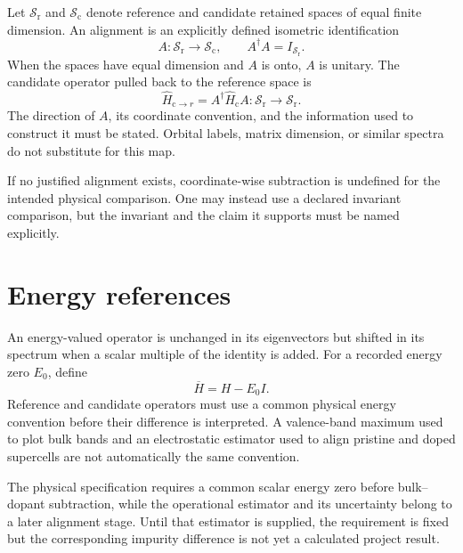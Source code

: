Let $\mathcal S_{\mathrm r}$ and $\mathcal S_{\mathrm c}$ denote reference and
candidate retained spaces of equal finite dimension. An alignment is an
explicitly defined isometric identification
\begin{equation}
  A:\mathcal S_{\mathrm r}\longrightarrow\mathcal S_{\mathrm c},
  \qquad
  A^{\dagger}A=I_{\mathcal S_{\mathrm r}}.
\end{equation}
When the spaces have equal dimension and $A$ is onto, $A$ is unitary. The
candidate operator pulled back to the reference space is
\begin{equation}
  \widehat H_{\mathrm c\rightarrow r}
  =
  A^{\dagger}\widehat H_{\mathrm c}A
  :\mathcal S_{\mathrm r}\longrightarrow\mathcal S_{\mathrm r}.
\end{equation}
The direction of $A$, its coordinate convention, and the information used to
construct it must be stated. Orbital labels, matrix dimension, or similar
spectra do not substitute for this map.

If no justified alignment exists, coordinate-wise subtraction is undefined for
the intended physical comparison. One may instead use a declared invariant
comparison, but the invariant and the claim it supports must be named
explicitly.

\section{Energy references}


An energy-valued operator is unchanged in its eigenvectors but shifted in its
spectrum when a scalar multiple of the identity is added. For a recorded energy
zero $E_0$, define
\begin{equation}
  \overline H=H-E_0I.
\end{equation}
Reference and candidate operators must use a common physical energy convention
before their difference is interpreted. A valence-band maximum used to plot
bulk bands and an electrostatic estimator used to align pristine and doped
supercells are not automatically the same convention.

The physical specification requires a common scalar energy zero before
bulk--dopant subtraction, while the operational estimator and its uncertainty
belong to a later alignment stage. Until that estimator is supplied, the
requirement is fixed but the corresponding impurity difference is not yet a
calculated project result.


